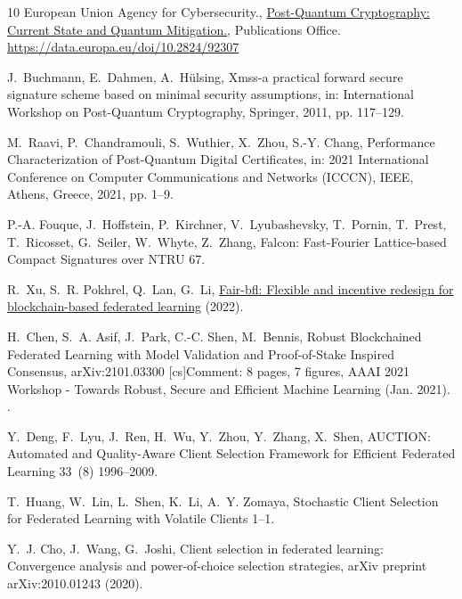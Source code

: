 \documentclass[lettersize,journal]{IEEEtran}
\begin{document}
\begin{thebibliography}{10}
{European Union Agency for Cybersecurity.},
  \href{https://data.europa.eu/doi/10.2824/92307}{Post-Quantum Cryptography:
  Current State and Quantum Mitigation.}, {Publications Office}.
\newline\urlprefix\url{https://data.europa.eu/doi/10.2824/92307}

J.~Buchmann, E.~Dahmen, A.~H{\"u}lsing, Xmss-a practical forward secure
  signature scheme based on minimal security assumptions, in: International
  Workshop on Post-Quantum Cryptography, Springer, 2011, pp. 117--129.

M.~Raavi, P.~Chandramouli, S.~Wuthier, X.~Zhou, S.-Y. Chang, Performance
  {{Characterization}} of {{Post-Quantum Digital Certificates}}, in: 2021
  {{International Conference}} on {{Computer Communications}} and {{Networks}}
  ({{ICCCN}}), {IEEE}, {Athens, Greece}, 2021, pp. 1--9.


P.-A. Fouque, J.~Hoffstein, P.~Kirchner, V.~Lyubashevsky, T.~Pornin, T.~Prest,
  T.~Ricosset, G.~Seiler, W.~Whyte, Z.~Zhang, Falcon: {{Fast-Fourier
  Lattice-based Compact Signatures}} over {{NTRU}}  67.

R.~Xu, S.~R. Pokhrel, Q.~Lan, G.~Li,
  \href{https://arxiv.org/abs/2206.12899}{Fair-bfl: Flexible and incentive
  redesign for blockchain-based federated learning} (2022).



H.~Chen, S.~A. Asif, J.~Park, C.-C. Shen, M.~Bennis, Robust {{Blockchained
  Federated Learning}} with {{Model Validation}} and {{Proof-of-Stake Inspired
  Consensus}}, arXiv:2101.03300 [cs]Comment: 8 pages, 7 figures, AAAI 2021
  Workshop - Towards Robust, Secure and Efficient Machine Learning (Jan. 2021).
.

Y.~Deng, F.~Lyu, J.~Ren, H.~Wu, Y.~Zhou, Y.~Zhang, X.~Shen, {{AUCTION}}:
  {{Automated}} and {{Quality-Aware Client Selection Framework}} for
  {{Efficient Federated Learning}} 33~(8)  1996--2009.


T.~Huang, W.~Lin, L.~Shen, K.~Li, A.~Y. Zomaya, Stochastic {{Client Selection}}
  for {{Federated Learning}} with {{Volatile Clients}}  1--1.


Y.~J. Cho, J.~Wang, G.~Joshi, Client selection in federated learning:
  Convergence analysis and power-of-choice selection strategies, arXiv preprint
  arXiv:2010.01243 (2020).


\end{thebibliography}
\end{document}
